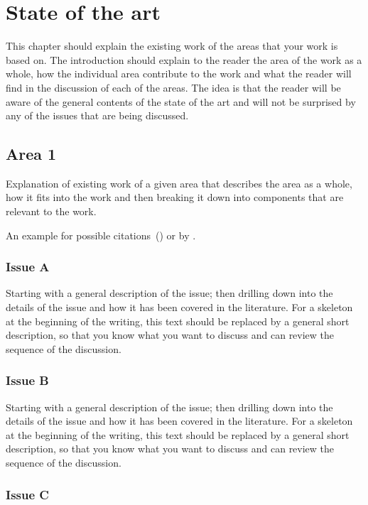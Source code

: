 \chapter{State of the art}

This chapter should explain the existing work of the areas that your work is based on. The introduction should explain to the reader the area of the work as a whole, how the individual area contribute to the work and what the reader will find in the discussion of each of the areas. The idea is that the reader will be aware of the general contents of the state of the art and will not be surprised by any of the issues that are being discussed.


\section{Area 1}

Explanation of existing work of a given area that describes the area as a whole, how it fits into the work and then breaking it down into components that are relevant to the work.

An example for possible citations~(\cite{Andrew2013empirical}) or by \cite{Asghari2015Economics}.


\subsection{Issue A}

Starting with a general description of the issue; then drilling down into the details of the issue and how it has been covered in the literature. For a skeleton at the beginning of the writing, this text should be replaced by a general short description, so that you know what you want to discuss and can review the sequence of the discussion.

\subsection{Issue B}

Starting with a general description of the issue; then drilling down into the details of the issue and how it has been covered in the literature. For a skeleton at the beginning of the writing, this text should be replaced by a general short description, so that you know what you want to discuss and can review the sequence of the discussion.

\subsection{Issue C}

